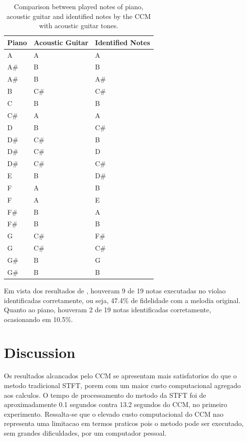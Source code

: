 \documentclass{article}
\begin{document}
	\begin{table}[h]
	 \begin{center}
	 \begin{tabular}{|l|l|l|}
	  \hline
	  Piano & Acoustic Guitar & Identified Notes \\
	  \hline
			  A & A &  A \\
		A\# &  B &  B \\
		    A\# &  B &    A\# \\
		    B  &   C\# &  C\# \\
		    C   &  B  &   B \\
		    C\# &  A   &  A \\
		    D   &  B   &  C\# \\
		    D\# &  C\# &  B \\
		    D\# &  C\# &  D \\
		    D\# &  C\# &  C\# \\
		    E   &  B  &   D\# \\
		    F   &  A   &  B \\
		    F   &  A  &   E \\
		    F\# &  B  &   A \\
		    F\# &  B   &  B \\
		    G   &  C\# &  F\# \\
		    G   &  C\# &  C\# \\
		    G\# &  B   &  G \\
		    G\# &  B  &   B \\
	  \hline
	 \end{tabular}
	\end{center}
	 \caption{Comparison between played notes of piano, acoustic guitar and identified notes by the CCM with acoustic guitar tones.}
	 \label{tab:table-2-ccm-violao}
	\end{table}

	Em vista dos resultados de , houveram 9 de 19 notas executadas no violao identificadas corretamente, ou seja, 47.4\% de fidelidade com a melodia original. Quanto ao piano, houveram 2 de 19 notas identificadas corretamente, ocasionando em 10.5\%.


\section{Discussion}\label{sec:discussion}

	Os resultados alcancados pelo CCM se apresentam mais satisfatorios do que o metodo tradicional STFT, porem com um maior custo computacional agregado aos calculos. O tempo de processamento do metodo da STFT foi de aproximadamente 0.1 segundos contra 13.2 segundos do CCM, no primeiro experimento. Ressalta-se que o elevado custo computacional do CCM nao representa uma limitacao em termos praticos pois o metodo pode ser executado, sem grandes dificuldades, por um computador pessoal.
\end{document}
